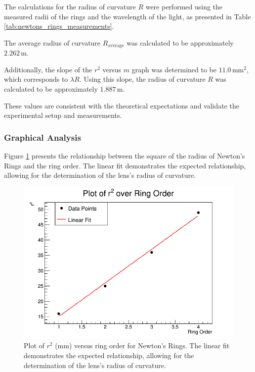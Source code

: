 \documentclass[journal]{IEEEtran}
\begin{document}
The calculations for the radius of curvature $R$ were performed using the measured radii of the rings and the wavelength of the light, as presented in Table \ref{tab:newtons_rings_measurements}.

The average radius of curvature $R_{\text{average}}$ was calculated to be approximately $2.262 \, \text{m}$.

Additionally, the slope of the $r^2$ versus $m$ graph was determined to be $11.0 \, \text{mm}^2$, which corresponds to $\lambda R$. Using this slope, the radius of curvature $R$ was calculated to be approximately $1.887 \, \text{m}$.

These values are consistent with the theoretical expectations and validate the experimental setup and measurements.

\subsubsection{Graphical Analysis}
Figure \ref{fig:r_squared_vs_order} presents the relationship between the square of the radius of Newton's Rings and the ring order. The linear fit demonstrates the expected relationship, allowing for the determination of the lens's radius of curvature.

\begin{figure}[H]
    \centering
    \includegraphics[width=\linewidth]{../plots/r_squared_vs_order.png}
    \caption{Plot of $r^2$ (mm) versus ring order for Newton's Rings. The linear fit demonstrates the expected relationship, allowing for the determination of the lens's radius of curvature.}
    \label{fig:r_squared_vs_order}
\end{figure}
\end{document}
